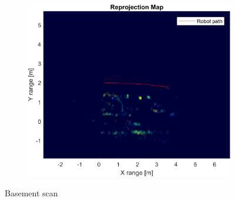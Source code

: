 \begin{figure}[htbp]
\begin{subfigure}[t]{0.475\linewidth}
    \end{subfigure}\bigskip\\
    \begin{subfigure}[t]{0.5\linewidth}   
        \centering 
        \includegraphics[width=\linewidth,max height=.475\textheight]{gfx/results/basement_reprojection.png}
    \end{subfigure}%
    \caption{Basement scan}
\end{figure}


